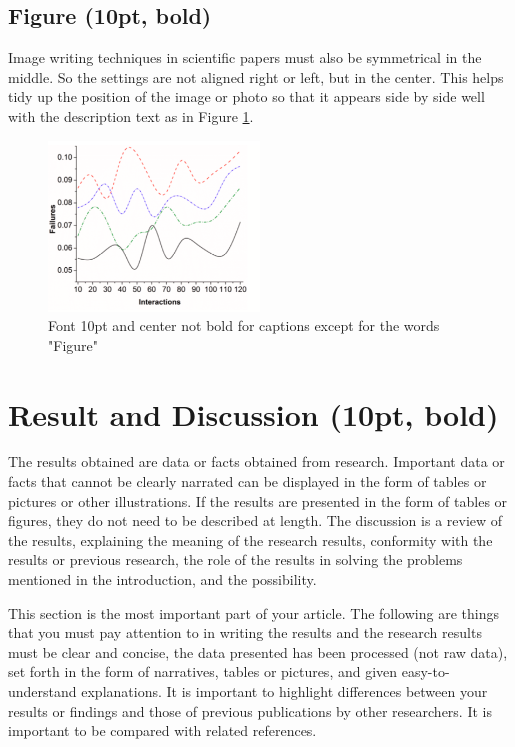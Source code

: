 \documentclass{article}
\begin{document}
\subsection{Figure (10pt, bold)}
Image writing techniques in scientific papers must also be symmetrical in the middle. So the settings are not aligned right or left, but in the center. This helps tidy up the position of the image or photo so that it appears side by side well with the description text as in Figure \ref{fig2}.

\begin{figure}[h]
	\centering
	\includegraphics[width=0.5\textwidth]{images/figur2.PNG}
	\caption{Font 10pt and center not bold for captions except for the words "Figure"  }
	\label{fig2}
\end{figure}


\section{Result and Discussion (10pt, bold)}
The results obtained are data or facts obtained from research. Important data or facts that cannot be clearly narrated can be displayed in the form of tables or pictures or other illustrations. If the results are presented in the form of tables or figures, they do not need to be described at length. The discussion is a review of the results, explaining the meaning of the research results, conformity with the results or previous research, the role of the results in solving the problems mentioned in the introduction, and the possibility.

This section is the most important part of your article. The following are things that you must pay attention to in writing the results and the research results must be clear and concise, the data presented has been processed (not raw data), set forth in the form of narratives, tables or pictures, and given easy-to-understand explanations. It is important to highlight differences between your results or findings and those of previous publications by other researchers. It is important to be compared with related references.
\end{document}
